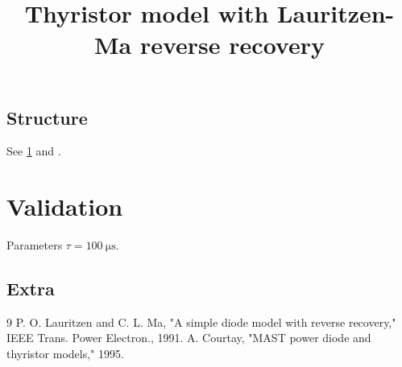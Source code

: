 \documentclass[11pt]{article}
\title{Thyristor model with Lauritzen-Ma reverse recovery}
\begin{document}
\maketitle
\section{Structure}
\label{sec:struct}
See \ref{sec:struct} and \cite{lauritzen1991,courtay1995}.
\chapter{Validation}
Parameters $\tau=\SI{100}{\micro\second}$.
\appendix
\section{Extra}
\begin{thebibliography}{9}
 P. O. Lauritzen and C. L. Ma, "A simple diode model with reverse recovery," IEEE Trans. Power Electron., 1991.
 A. Courtay, "MAST power diode and thyristor models," 1995.
\end{thebibliography}
\end{document}
